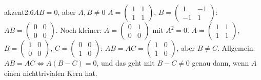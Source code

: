 \begin{loesungkarte}{akzent}{2.6}{$AB = 0$, aber $A, B\neq0$}
$A = \begin{pmatrix}1 & 1\\ 1 & 1\end{pmatrix}$, $B = \begin{pmatrix}1 & -1\\ -1 & 1\end{pmatrix}$: $AB = \begin{pmatrix}0 & 0\\ 0 & 0\end{pmatrix}$. Noch kleiner: $A = \begin{pmatrix}0 & 1\\ 0 & 0\end{pmatrix}$ mit $A^{2} = 0$.
$A = \begin{pmatrix}1 & 1\\ 1 & 1\end{pmatrix}$, $B = \begin{pmatrix}1 & 0\\ 0 & 0\end{pmatrix}$, $C = \begin{pmatrix}0 & 0\\ 1 & 0\end{pmatrix}$: $AB = AC = \begin{pmatrix}1 & 0\\ 1 & 0\end{pmatrix}$, aber $B\neq C$. Allgemein: $AB = AC\iff A(B - C) = 0$, und das geht mit $B - C\neq0$ genau dann, wenn $A$ einen nichttrivialen Kern hat.

\end{loesungkarte}
